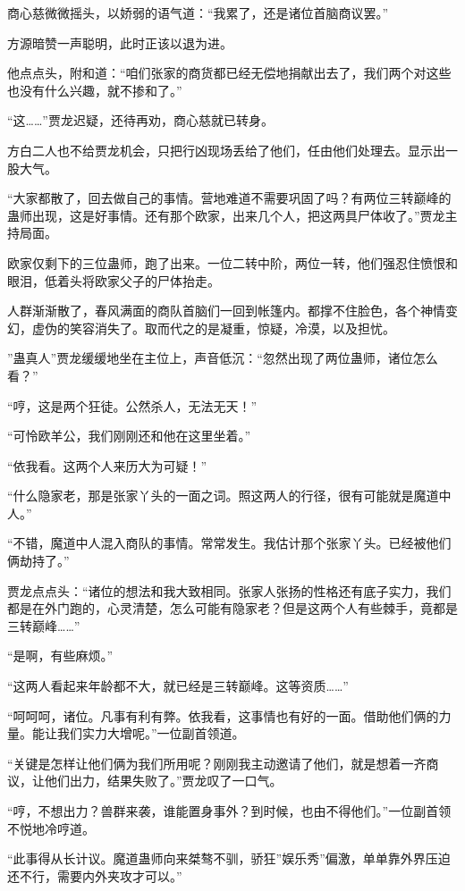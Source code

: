 \begin{this_body}
商心慈微微摇头，以娇弱的语气道：“我累了，还是诸位首脑商议罢。”

方源暗赞一声聪明，此时正该以退为进。

他点点头，附和道：“咱们张家的商货都已经无偿地捐献出去了，我们两个对这些也没有什么兴趣，就不掺和了。”

“这……”贾龙迟疑，还待再劝，商心慈就已转身。

方白二人也不给贾龙机会，只把行凶现场丢给了他们，任由他们处理去。显示出一股大气。

“大家都散了，回去做自己的事情。营地难道不需要巩固了吗？有两位三转巅峰的蛊师出现，这是好事情。还有那个欧家，出来几个人，把这两具尸体收了。”贾龙主持局面。

欧家仅剩下的三位蛊师，跑了出来。一位二转中阶，两位一转，他们强忍住愤恨和眼泪，低着头将欧家父子的尸体抬走。

人群渐渐散了，春风满面的商队首脑们一回到帐篷内。都撑不住脸色，各个神情变幻，虚伪的笑容消失了。取而代之的是凝重，惊疑，冷漠，以及担忧。

”蛊真人”贾龙缓缓地坐在主位上，声音低沉：“忽然出现了两位蛊师，诸位怎么看？”

“哼，这是两个狂徒。公然杀人，无法无天！”

“可怜欧羊公，我们刚刚还和他在这里坐着。”

“依我看。这两个人来历大为可疑！”

“什么隐家老，那是张家丫头的一面之词。照这两人的行径，很有可能就是魔道中人。”

“不错，魔道中人混入商队的事情。常常发生。我估计那个张家丫头。已经被他们俩劫持了。”

贾龙点点头：“诸位的想法和我大致相同。张家人张扬的性格还有底子实力，我们都是在外门跑的，心灵清楚，怎么可能有隐家老？但是这两个人有些棘手，竟都是三转巅峰……”

“是啊，有些麻烦。”

“这两人看起来年龄都不大，就已经是三转巅峰。这等资质……”

“呵呵呵，诸位。凡事有利有弊。依我看，这事情也有好的一面。借助他们俩的力量。能让我们实力大增呢。”一位副首领道。

“关键是怎样让他们俩为我们所用呢？刚刚我主动邀请了他们，就是想着一齐商议，让他们出力，结果失败了。”贾龙叹了一口气。

“哼，不想出力？兽群来袭，谁能置身事外？到时候，也由不得他们。”一位副首领不悦地冷哼道。

“此事得从长计议。魔道蛊师向来桀骜不驯，骄狂”娱乐秀”偏激，单单靠外界压迫还不行，需要内外夹攻才可以。”


\end{this_body}
